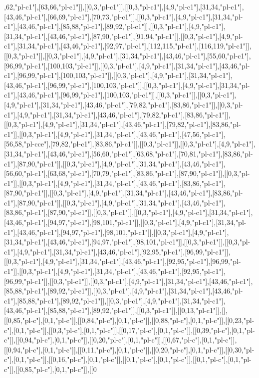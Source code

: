 ,62,"pl-c1"],[63,66,"pl-c1"]],[[0,3,"pl-c1"]],[[0,3,"pl-c1"],[4,9,"pl-c1"],[31,34,"pl-c1"],[43,46,"pl-c1"],[66,69,"pl-c1"],[70,73,"pl-c1"]],[[0,3,"pl-c1"],[4,9,"pl-c1"],[31,34,"pl-c1"],[43,46,"pl-c1"],[85,88,"pl-c1"],[89,92,"pl-c1"]],[[0,3,"pl-c1"],[4,9,"pl-c1"],[31,34,"pl-c1"],[43,46,"pl-c1"],[87,90,"pl-c1"],[91,94,"pl-c1"]],[[0,3,"pl-c1"],[4,9,"pl-c1"],[31,34,"pl-c1"],[43,46,"pl-c1"],[92,97,"pl-c1"],[112,115,"pl-c1"],[116,119,"pl-c1"]],[[0,3,"pl-c1"]],[[0,3,"pl-c1"],[4,9,"pl-c1"],[31,34,"pl-c1"],[43,46,"pl-c1"],[55,60,"pl-c1"],[96,99,"pl-c1"],[100,103,"pl-c1"]],[[0,3,"pl-c1"],[4,9,"pl-c1"],[31,34,"pl-c1"],[43,46,"pl-c1"],[96,99,"pl-c1"],[100,103,"pl-c1"]],[[0,3,"pl-c1"],[4,9,"pl-c1"],[31,34,"pl-c1"],[43,46,"pl-c1"],[96,99,"pl-c1"],[100,103,"pl-c1"]],[[0,3,"pl-c1"],[4,9,"pl-c1"],[31,34,"pl-c1"],[43,46,"pl-c1"],[96,99,"pl-c1"],[100,103,"pl-c1"]],[[0,3,"pl-c1"]],[[0,3,"pl-c1"],[4,9,"pl-c1"],[31,34,"pl-c1"],[43,46,"pl-c1"],[79,82,"pl-c1"],[83,86,"pl-c1"]],[[0,3,"pl-c1"],[4,9,"pl-c1"],[31,34,"pl-c1"],[43,46,"pl-c1"],[79,82,"pl-c1"],[83,86,"pl-c1"]],[[0,3,"pl-c1"],[4,9,"pl-c1"],[31,34,"pl-c1"],[43,46,"pl-c1"],[79,82,"pl-c1"],[83,86,"pl-c1"]],[[0,3,"pl-c1"],[4,9,"pl-c1"],[31,34,"pl-c1"],[43,46,"pl-c1"],[47,56,"pl-c1"],[56,58,"pl-cce"],[79,82,"pl-c1"],[83,86,"pl-c1"]],[[0,3,"pl-c1"]],[[0,3,"pl-c1"],[4,9,"pl-c1"],[31,34,"pl-c1"],[43,46,"pl-c1"],[56,60,"pl-c1"],[63,68,"pl-c1"],[70,81,"pl-c1"],[83,86,"pl-c1"],[87,90,"pl-c1"]],[[0,3,"pl-c1"],[4,9,"pl-c1"],[31,34,"pl-c1"],[43,46,"pl-c1"],[56,60,"pl-c1"],[63,68,"pl-c1"],[70,79,"pl-c1"],[83,86,"pl-c1"],[87,90,"pl-c1"]],[[0,3,"pl-c1"]],[[0,3,"pl-c1"],[4,9,"pl-c1"],[31,34,"pl-c1"],[43,46,"pl-c1"],[83,86,"pl-c1"],[87,90,"pl-c1"]],[[0,3,"pl-c1"],[4,9,"pl-c1"],[31,34,"pl-c1"],[43,46,"pl-c1"],[83,86,"pl-c1"],[87,90,"pl-c1"]],[[0,3,"pl-c1"],[4,9,"pl-c1"],[31,34,"pl-c1"],[43,46,"pl-c1"],[83,86,"pl-c1"],[87,90,"pl-c1"]],[[0,3,"pl-c1"]],[[0,3,"pl-c1"],[4,9,"pl-c1"],[31,34,"pl-c1"],[43,46,"pl-c1"],[94,97,"pl-c1"],[98,101,"pl-c1"]],[[0,3,"pl-c1"],[4,9,"pl-c1"],[31,34,"pl-c1"],[43,46,"pl-c1"],[94,97,"pl-c1"],[98,101,"pl-c1"]],[[0,3,"pl-c1"],[4,9,"pl-c1"],[31,34,"pl-c1"],[43,46,"pl-c1"],[94,97,"pl-c1"],[98,101,"pl-c1"]],[[0,3,"pl-c1"]],[[0,3,"pl-c1"],[4,9,"pl-c1"],[31,34,"pl-c1"],[43,46,"pl-c1"],[92,95,"pl-c1"],[96,99,"pl-c1"]],[[0,3,"pl-c1"],[4,9,"pl-c1"],[31,34,"pl-c1"],[43,46,"pl-c1"],[92,95,"pl-c1"],[96,99,"pl-c1"]],[[0,3,"pl-c1"],[4,9,"pl-c1"],[31,34,"pl-c1"],[43,46,"pl-c1"],[92,95,"pl-c1"],[96,99,"pl-c1"]],[[0,3,"pl-c1"]],[[0,3,"pl-c1"],[4,9,"pl-c1"],[31,34,"pl-c1"],[43,46,"pl-c1"],[85,88,"pl-c1"],[89,92,"pl-c1"]],[[0,3,"pl-c1"],[4,9,"pl-c1"],[31,34,"pl-c1"],[43,46,"pl-c1"],[85,88,"pl-c1"],[89,92,"pl-c1"]],[[0,3,"pl-c1"],[4,9,"pl-c1"],[31,34,"pl-c1"],[43,46,"pl-c1"],[85,88,"pl-c1"],[89,92,"pl-c1"]],[[0,3,"pl-c1"]],[[0,13,"pl-c1"]],[],[[0,85,"pl-c"],[0,1,"pl-c"]],[[0,84,"pl-c"],[0,1,"pl-c"]],[[0,88,"pl-c"],[0,1,"pl-c"]],[[0,23,"pl-c"],[0,1,"pl-c"]],[[0,3,"pl-c"],[0,1,"pl-c"]],[[0,17,"pl-c"],[0,1,"pl-c"]],[[0,39,"pl-c"],[0,1,"pl-c"]],[[0,94,"pl-c"],[0,1,"pl-c"]],[[0,20,"pl-c"],[0,1,"pl-c"]],[[0,67,"pl-c"],[0,1,"pl-c"]],[[0,94,"pl-c"],[0,1,"pl-c"]],[[0,11,"pl-c"],[0,1,"pl-c"]],[[0,20,"pl-c"],[0,1,"pl-c"]],[[0,30,"pl-c"],[0,1,"pl-c"]],[[0,16,"pl-c"],[0,1,"pl-c"]],[[0,1,"pl-c"],[0,1,"pl-c"]],[[0,1,"pl-c"],[0,1,"pl-c"]],[[0,85,"pl-c"],[0,1,"pl-c"]],[[0